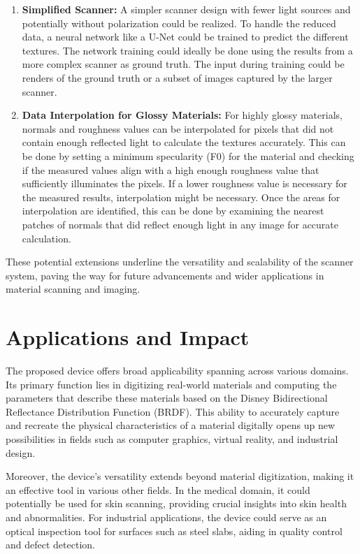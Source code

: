 \documentclass[11pt, twoside, listof=totocnumbered, bibliography=totocnumbered]{scrartcl}
\begin{document}
\begin{enumerate}
	\item \textbf{Simplified Scanner:} A simpler scanner design with fewer light sources and potentially without polarization could be realized. To handle the reduced data, a neural network like a U-Net could be trained to predict the different textures. The network training could ideally be done using the results from a more complex scanner as ground truth. The input during training could be renders of the ground truth or a subset of images captured by the larger scanner.
	\item \textbf{Data Interpolation for Glossy Materials:} For highly glossy materials, normals and roughness values can be interpolated for pixels that did not contain enough reflected light to calculate the textures accurately. This can be done by setting a minimum specularity (F0) for the material and checking if the measured values align with a high enough roughness value that sufficiently illuminates the pixels. If a lower roughness value is necessary for the measured results, interpolation might be necessary. Once the areas for interpolation are identified, this can be done by examining the nearest patches of normals that did reflect enough light in any image for accurate calculation.
\end{enumerate}

These potential extensions underline the versatility and scalability of the scanner system, paving the way for future advancements and wider applications in material scanning and imaging.

\section{Applications and Impact}
The proposed device offers broad applicability spanning across various domains. Its primary function lies in digitizing real-world materials and computing the parameters that describe these materials based on the Disney Bidirectional Reflectance Distribution Function (BRDF).\cite{DISNEY_BRDF} This ability to accurately capture and recreate the physical characteristics of a material digitally opens up new possibilities in fields such as computer graphics, virtual reality, and industrial design.

Moreover, the device's versatility extends beyond material digitization, making it an effective tool in various other fields. In the medical domain, it could potentially be used for skin scanning, providing crucial insights into skin health and abnormalities. For industrial applications, the device could serve as an optical inspection tool for surfaces such as steel slabs, aiding in quality control and defect detection.
\end{document}
